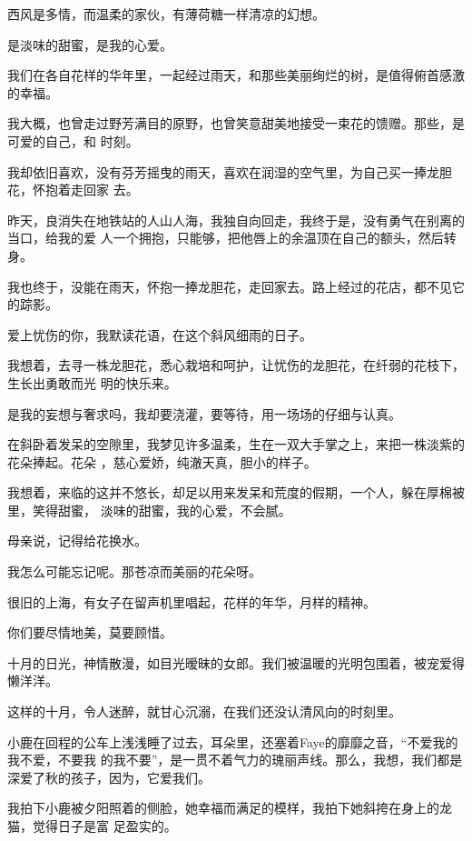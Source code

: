 \documentclass[12pt,a4paper]{article}
\def\blankrev{\vspace{1ex}}									%
\begin{document}
		西风是多情，而温柔的家伙，有薄荷糖一样清凉的幻想。

		是淡味的甜蜜，是我的心爱。

		我们在各自花样的华年里，一起经过雨天，和那些美丽绚烂的树，是值得俯首感激的幸福。


		我大概，也曾走过野芳满目的原野，也曾笑意甜美地接受一束花的馈赠。那些，是可爱的自己，和
	时刻。

		我却依旧喜欢，没有芬芳摇曳的雨天，喜欢在润湿的空气里，为自己买一捧龙胆花，怀抱着走回家
	去。

		昨天，良消失在地铁站的人山人海，我独自向回走，我终于是，没有勇气在别离的当口，给我的爱
	人一个拥抱，只能够，把他唇上的余温顶在自己的额头，然后转身。

		我也终于，没能在雨天，怀抱一捧龙胆花，走回家去。路上经过的花店，都不见它的踪影。

		爱上忧伤的你，我默读花语，在这个斜风细雨的日子。

		我想着，去寻一株龙胆花，悉心栽培和呵护，让忧伤的龙胆花，在纤弱的花枝下，生长出勇敢而光
	明的快乐来。

		是我的妄想与奢求吗，我却要浇灌，要等待，用一场场的仔细与认真。

		\blankrev

		在斜卧着发呆的空隙里，我梦见许多温柔，生在一双大手掌之上，来把一株淡紫的花朵捧起。花朵
	，慈心爱娇，纯澈天真，胆小的样子。

		我想着，来临的这并不悠长，却足以用来发呆和荒度的假期，一个人，躲在厚棉被里，笑得甜蜜，
	淡味的甜蜜，我的心爱，不会腻。


		母亲说，记得给花换水。

		我怎么可能忘记呢。那苍凉而美丽的花朵呀。

		很旧的上海，有女子在留声机里唱起，花样的年华，月样的精神。


		你们要尽情地美，莫要顾惜。

	\endwriting



		十月的日光，神情散漫，如目光暧昧的女郎。我们被温暖的光明包围着，被宠爱得懒洋洋。

		这样的十月，令人迷醉，就甘心沉溺，在我们还没认清风向的时刻里。

		小鹿在回程的公车上浅浅睡了过去，耳朵里，还塞着Faye的靡靡之音，“不爱我的我不爱，不要我
	的我不要”，是一贯不着气力的瑰丽声线。那么，我想，我们都是深爱了秋的孩子，因为，它爱我们。

		我拍下小鹿被夕阳照着的侧脸，她幸福而满足的模样，我拍下她斜挎在身上的龙猫，觉得日子是富
	足盈实的。
\end{document}
